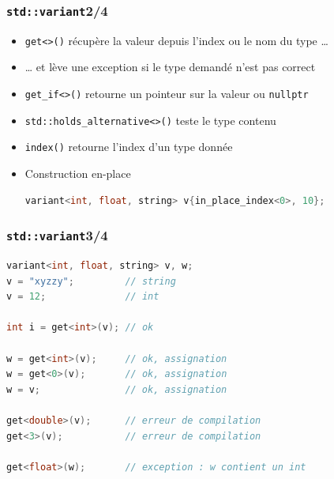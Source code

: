 \documentclass[C++.tex]{subfiles}
\begin{document}
\begin{frame}[fragile]
	\frametitle{\lstinline|std::variant|\titlehfill{}2/4}
	\begin{itemize}
		\item \lstinline|get<>()| récupère la valeur depuis l'index ou le nom du type \ldots
		\item \ldots{} et lève une exception si le type demandé n'est pas correct
		\item \lstinline|get_if<>()| retourne un pointeur sur la valeur ou \lstinline|nullptr|

		\item \lstinline|std::holds_alternative<>()| teste le type contenu
		\item \lstinline|index()| retourne l'index d'un type donnée

		\item Construction en-place
		
		\begin{lstlisting}[language=C++]
variant<int, float, string> v{in_place_index<0>, 10};\end{lstlisting}
		
		
		
		
	\end{itemize}
\end{frame}


\begin{frame}[fragile]
	\frametitle{\lstinline|std::variant|\titlehfill{}3/4}
	\begin{lstlisting}[language=C++]
variant<int, float, string> v, w;
v = "xyzzy";         // string
v = 12;              // int

int i = get<int>(v); // ok

w = get<int>(v);     // ok, assignation
w = get<0>(v);       // ok, assignation
w = v;               // ok, assignation

get<double>(v);      // erreur de compilation
get<3>(v);           // erreur de compilation

get<float>(w);       // exception : w contient un int\end{lstlisting}
\end{frame}
\end{document}
